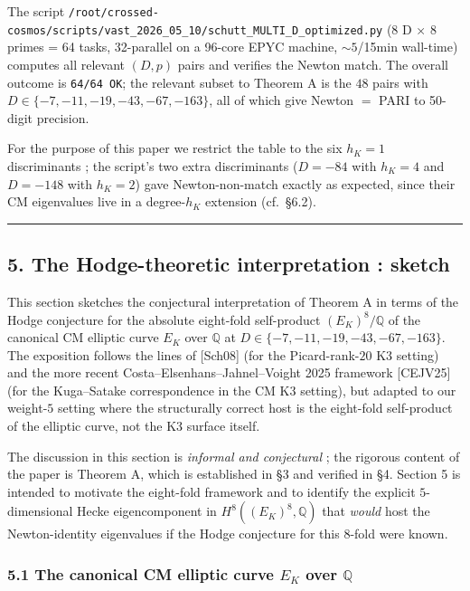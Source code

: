 \documentclass[
  11pt,
  a4paper,
]{amsart}
\begin{document}
The script \texttt{/root/crossed-cosmos/scripts/vast\_2026\_05\_10/schutt\_MULTI\_D\_optimized.py} (8 D × 8 primes = 64 tasks, 32-parallel on a 96-core EPYC machine, \(\sim 5\)/15min wall-time) computes all relevant \((D, p)\) pairs and verifies the Newton match. The overall outcome is \texttt{64/64\ OK}; the relevant subset to Theorem A is the \(48\) pairs with \(D \in \{-7, -11, -19, -43, -67, -163\}\), all of which give Newton \(=\) PARI to 50-digit precision.

For the purpose of this paper we restrict the table to the six \(h_K = 1\) discriminants ; the script's two extra discriminants (\(D = -84\) with \(h_K = 4\) and \(D = -148\) with \(h_K = 2\)) gave Newton-non-match exactly as expected, since their CM eigenvalues live in a degree-\(h_K\) extension (cf.~§6.2).

\begin{center}\rule{0.5\linewidth}{0.5pt}\end{center}

\hypertarget{the-hodge-theoretic-interpretation-sketch}{%
\subsection{5. The Hodge-theoretic interpretation : sketch}\label{the-hodge-theoretic-interpretation-sketch}}

This section sketches the conjectural interpretation of Theorem A in terms of the Hodge conjecture for the absolute eight-fold self-product \((E_K)^8 / \mathbb{Q}\) of the canonical CM elliptic curve \(E_K\) over \(\mathbb{Q}\) at \(D \in \{-7, -11, -19, -43, -67, -163\}\). The exposition follows the lines of {[}Sch08{]} (for the Picard-rank-\(20\) K3 setting) and the more recent Costa--Elsenhans--Jahnel--Voight 2025 framework {[}CEJV25{]} (for the Kuga--Satake correspondence in the CM K3 setting), but adapted to our weight-\(5\) setting where the structurally correct host is the eight-fold self-product of the elliptic curve, not the K3 surface itself.

The discussion in this section is \emph{informal and conjectural} ; the rigorous content of the paper is Theorem A, which is established in §3 and verified in §4. Section 5 is intended to motivate the eight-fold framework and to identify the explicit \(5\)-dimensional Hecke eigencomponent in \(H^8((E_K)^8, \mathbb{Q})\) that \emph{would} host the Newton-identity eigenvalues if the Hodge conjecture for this \(8\)-fold were known.

\hypertarget{the-canonical-cm-elliptic-curve-e_k-over-mathbbq}{%
\subsubsection{\texorpdfstring{5.1 The canonical CM elliptic curve \(E_K\) over \(\mathbb{Q}\)}{5.1 The canonical CM elliptic curve E\_K over \textbackslash mathbb\{Q\}}}\label{the-canonical-cm-elliptic-curve-e_k-over-mathbbq}}
\end{document}
